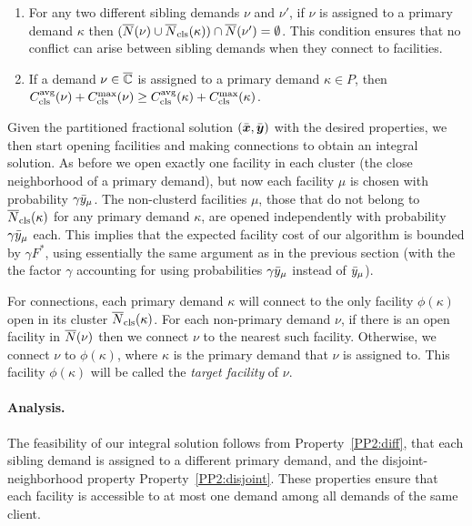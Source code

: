\documentclass[11pt]{article}
\begin{document}
\begin{enumerate}
\begin{enumerate}
\item \label{PP2:disjoint} For any two different sibling
  demands $\nu$ and $\nu'$, if $\nu$ is assigned to a
  primary demand $\kappa$ then $({\overline{N}}(\nu) \cup
  {\overline{N}}_{\text{cls}}(\kappa)) \cap {\overline{N}}(\nu') = \emptyset$.  This
  condition ensures that no conflict can arise between
  sibling demands when they connect to facilities.

\item \label{PP2:cost} If a demand $\nu\in\overline{\mathbb{C}}$ is
  assigned to a primary demand $\kappa\in P$, then
  $C_{\text{cls}}^{{\mbox{\scriptsize\rm avg}}}(\nu)+C_{\text{cls}}^{\max}(\nu) \geq
  C_{\text{cls}}^{{\mbox{\scriptsize\rm avg}}}(\kappa)+C_{\text{cls}}^{\max}(\kappa)$.
\end{enumerate}

\end{enumerate}

  Given
the partitioned fractional solution $(\bar{\boldsymbol{x}}, \bar{\boldsymbol{y}})$
with the desired properties, we then start opening
facilities and making connections to obtain an integral
solution. As before we open exactly one facility in each
cluster (the close neighborhood of a primary demand), but
now each facility $\mu$ is chosen with probability
$\gamma{\bar y}_{\mu}$. The non-clusterd facilities $\mu$,
those that do not belong to ${\overline{N}}_{\text{cls}}(\kappa)$ for any
primary demand $\kappa$, are opened independently with
probability $\gamma{\bar y}_{\mu}$ each. This implies that the
expected facility cost of our algorithm is bounded by
$\gamma F^\ast$, using essentially the same argument as in
the previous section (with the the factor $\gamma$
accounting for using probabilities $\gamma {\bar y}_{\mu}$
instead of ${\bar y}_{\mu}$).

For connections, each primary demand $\kappa$ will connect
to the only facility $\phi(\kappa)$ open in its cluster
${\overline{N}}_{\text{cls}}(\kappa)$.  For each non-primary demand $\nu$, if
there is an open facility in ${\overline{N}}(\nu)$ then we connect
$\nu$ to the nearest such facility. Otherwise, we connect
$\nu$ to $\phi(\kappa)$, where $\kappa$ is the primary
demand that $\nu$ is assigned to. This facility
$\phi(\kappa)$ will be called the \emph{target facility} of
$\nu$.


\paragraph{Analysis.}
The feasibility of our integral solution follows from
Property~\ref{PP2:diff}, that each sibling demand is
assigned to a different primary demand, and the disjoint-neighborhood property
Property~\ref{PP2:disjoint}. These properties ensure that
each facility is accessible to at most one demand among all demands of the same client.
\end{document}
